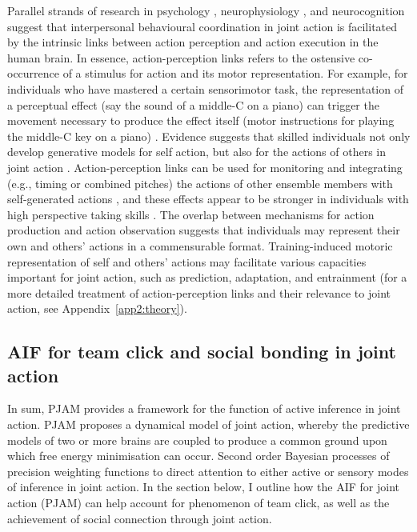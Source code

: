 \begin{CJK}{UTF8}{gbsn}
Parallel strands of research in psychology \citep{Prinz1990,Prinz1997,Prinz2013}, neurophysiology \citep{Rizzolatti2004,Rizzolatti2010}, and neurocognition \citep{Wolpert1998,Wolpert2000} suggest that interpersonal behavioural coordination in joint action is facilitated by the intrinsic links between action perception and action execution in the human brain.  In essence, action-perception links refers to the ostensive co-occurrence of a stimulus for action and its motor representation.  For example, for individuals who have mastered a certain sensorimotor task, the representation of a perceptual effect (say the sound of a middle-C on a piano) can trigger the movement necessary to produce the effect itself (motor instructions for playing the middle-C key on a piano) \citep{Novembre2014}. Evidence suggests that skilled individuals not only develop generative models for self action, but also for the actions of others in joint action \citep{Novembre2012}. Action-perception links can be used for monitoring and integrating (e.g., timing or combined pitches) the actions of other ensemble members with self-generated actions \citep{Loehr2013}, and these effects appear to be stronger in individuals with high perspective taking skills \citep{Novembre2012,Loehr2013}.  The overlap between mechanisms for action production and action observation suggests that individuals may represent their own and others’ actions in a commensurable format.  Training-induced motoric representation of self and others' actions may facilitate various capacities important for joint action, such as prediction, adaptation, and entrainment (for a more detailed treatment of action-perception links and their relevance to joint action, see Appendix~\ref{app2:theory}).

















\subsection{AIF for team click and social bonding in joint action\label{sect:AIFclickBonding}}

In sum, PJAM provides a framework for the function of active inference in joint action.  PJAM proposes a dynamical model of joint action, whereby the predictive models of two or more brains are coupled to produce a common ground upon which free energy minimisation can occur. Second order Bayesian processes of precision weighting functions to direct attention to either active or sensory modes of inference in joint action.   In the section below, I outline how the AIF for joint action (PJAM) can help account for  phenomenon of team click, as well as the achievement of social connection through joint action.


\end{CJK}
